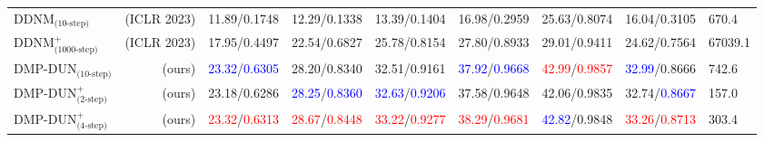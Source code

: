 \documentclass[10pt,twocolumn,letterpaper]{article}
\begin{document}
\begin{table}[th]
\begin{adjustbox}{width=\linewidth,center}
\begin{tabular}{@{}lrccccccl@{}}
			DDNM$_\text{(10-step)}$\cite{wang2022zero} & (ICLR 2023) & 11.89/0.1748 & 12.29/0.1338 & 13.39/0.1404 & 16.98/0.2959 & 25.63/0.8074 & 16.04/0.3105 & 670.4 \\
			DDNM$^+_\text{(1000-step)}$\cite{wang2022zero} & (ICLR 2023) & 17.95/0.4497 & 22.54/0.6827 & 25.78/0.8154 & 27.80/0.8933 & 29.01/0.9411 & 24.62/0.7564 & 67039.1 \\ \midrule
			DMP-DUN$_\text{(10-step)}$ & (ours) & \textcolor{blue}{23.32}/\textcolor{blue}{0.6305} & 28.20/0.8340 & 32.51/0.9161 & \textcolor{blue}{37.92}/\textcolor{blue}{0.9668} & \textcolor{red}{42.99}/\textcolor{red}{0.9857} & \textcolor{blue}{32.99}/0.8666 & 742.6 \\
			DMP-DUN$^+_\text{(2-step)}$ & (ours) & 23.18/0.6286 & \textcolor{blue}{28.25}/\textcolor{blue}{0.8360} & \textcolor{blue}{32.63}/\textcolor{blue}{0.9206} & 37.58/0.9648 & 42.06/0.9835 & 32.74/\textcolor{blue}{0.8667} & 157.0 \\
			DMP-DUN$^+_\text{(4-step)}$ & (ours) & \textcolor{red}{23.32}/\textcolor{red}{0.6313} & \textcolor{red}{28.67}/\textcolor{red}{0.8448} & \textcolor{red}{33.22}/\textcolor{red}{0.9277} & \textcolor{red}{38.29}/\textcolor{red}{0.9681} & \textcolor{blue}{42.82}/0.9848 & \textcolor{red}{33.26}/\textcolor{red}{0.8713} & 303.4 \\ \bottomrule
		\end{tabular}
	\end{adjustbox}
	

\end{table}
\end{document}
